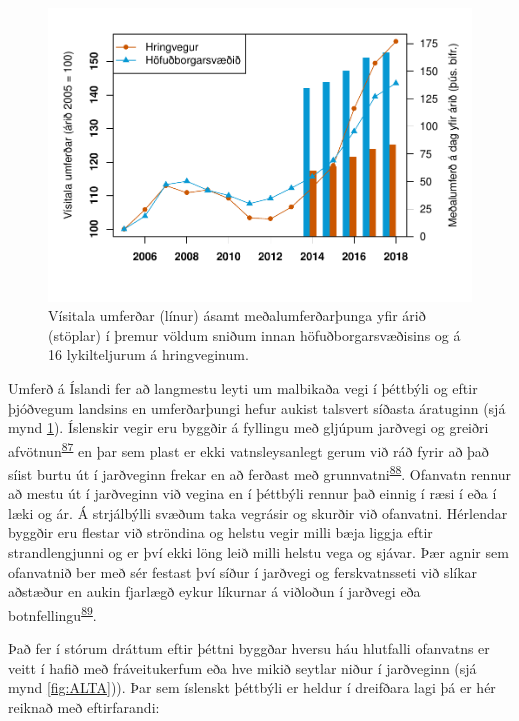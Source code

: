 \documentclass[icelandic,]{book}
\begin{document}
\begin{figure}[H]

{\centering \includegraphics{_bookdown_files/OrplastHaf_files/figure-latex/umferdvisitala1-1} 

}

\caption{Vísitala umferðar (línur) ásamt meðalumferðarþunga yfir árið (stöplar) í þremur völdum sniðum innan höfuðborgarsvæðisins og á 16 lykilteljurum á hringveginum.}\label{fig:umferdvisitala1}
\end{figure}

 Umferð á Íslandi fer að langmestu leyti um malbikaða vegi í þéttbýli og eftir þjóðvegum landsins en umferðarþungi hefur aukist talsvert síðasta áratuginn (sjá mynd \ref{fig:umferdvisitala1}). Íslenskir vegir eru byggðir á fyllingu með gljúpum jarðvegi og greiðri afvötnun\textsuperscript{\protect\hyperlink{ref-Matinupa2012Summary}{87}} en þar sem plast er ekki vatnsleysanlegt gerum við ráð fyrir að það síist burtu út í jarðveginn frekar en að ferðast með grunnvatni\textsuperscript{\protect\hyperlink{ref-ECHA2016}{88}}. Ofanvatn rennur að mestu út í jarðveginn við vegina en í þéttbýli rennur það einnig í ræsi í eða í læki og ár. Á strjálbýlli svæðum taka vegrásir og skurðir við ofanvatni. Hérlendar byggðir eru flestar við ströndina og helstu vegir milli bæja liggja eftir strandlengjunni og er því ekki löng leið milli helstu vega og sjávar. Þær agnir sem ofanvatnið ber með sér festast því síður í jarðvegi og ferskvatnsseti við slíkar aðstæður en aukin fjarlægð eykur líkurnar á viðloðun í jarðvegi eða botnfellingu\textsuperscript{\protect\hyperlink{ref-BESSELING2017540}{89}}.

Það fer í stórum dráttum eftir þéttni byggðar hversu háu hlutfalli ofanvatns er veitt í hafið með fráveitukerfum eða hve mikið seytlar niður í jarðveginn (sjá mynd \ref{fig:ALTA})). Þar sem íslenskt þéttbýli er heldur í dreifðara lagi þá er hér reiknað með eftirfarandi:
\end{document}
